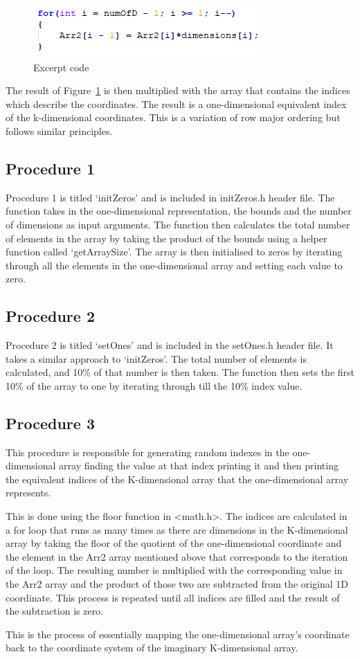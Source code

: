 \documentclass[journal, a4paper]{IEEEtran}
\begin{document}
	\begin{figure}[hbtp!]
		\centering
		\includegraphics[scale = 1]{code.png}
		\caption{Excerpt code}
		\label {code}
	\end{figure}

	The result of Figure~\ref{code} is then multiplied with the array that contains the indices which describe the coordinates. The result is a one-dimensional equivalent index of the k-dimensional coordinates. This is a variation of row major ordering but follows similar principles. 

\subsection{Procedure 1}
Procedure 1 is titled ‘initZeros’ and is included in initZeros.h header file. The function takes in the one-dimensional representation, the bounds and the number of dimensions as input arguments. The function then calculates the total number of elements in the array by taking the product of the bounds using a helper function called ‘getArraySize’. The array is then initialised to zeros by iterating through all the elements in the one-dimensional array and setting each value to zero.


\subsection{Procedure 2}
Procedure 2 is titled ‘setOnes’ and is included in the setOnes.h header file. It takes a similar approach to ‘initZeros’. The total number of elements is calculated, and 10\% of that number is then taken. The function then sets the first 10\% of the array to one by iterating through till the 10\% index value.

\subsection{Procedure 3}

This procedure is responsible for generating random indexes in the one-dimensional array finding the value at that index printing it and then  printing the equivalent indices of the K-dimensional array that the one-dimensional array represents. 

This is done using the floor function in <math.h>. The indices are calculated in a for loop that runs as many times as there are dimensions in the K-dimensional array by taking the floor of the quotient of the one-dimensional coordinate and the element in the Arr2 array mentioned above that corresponds to the iteration of the loop. The resulting number is multiplied with the corresponding value in the Arr2 array and the product of those two are subtracted from the original 1D coordinate. This process is repeated until all indices are filled and the result of the subtraction is zero.

This is the process of essentially mapping the one-dimensional array’s coordinate back to the coordinate system of the imaginary K-dimensional array.  
\end{document}
